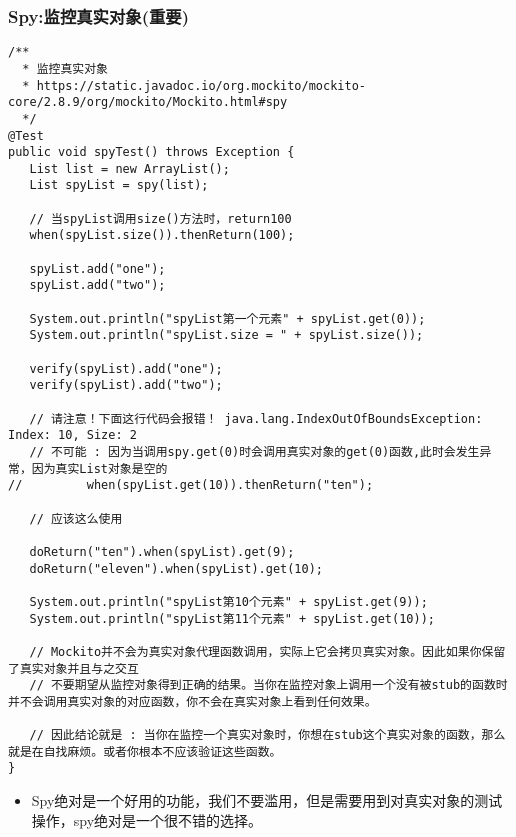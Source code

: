 \documentclass[9pt, b5paper]{article}
\begin{document}
\subsubsection{Spy:监控真实对象(重要)}
\label{sec-1-1-15}
\begin{verbatim}
/**
  * 监控真实对象
  * https://static.javadoc.io/org.mockito/mockito-core/2.8.9/org/mockito/Mockito.html#spy
  */
@Test
public void spyTest() throws Exception {
   List list = new ArrayList();
   List spyList = spy(list);

   // 当spyList调用size()方法时，return100
   when(spyList.size()).thenReturn(100);

   spyList.add("one");
   spyList.add("two");

   System.out.println("spyList第一个元素" + spyList.get(0));
   System.out.println("spyList.size = " + spyList.size());

   verify(spyList).add("one");
   verify(spyList).add("two");

   // 请注意！下面这行代码会报错！ java.lang.IndexOutOfBoundsException: Index: 10, Size: 2
   // 不可能 : 因为当调用spy.get(0)时会调用真实对象的get(0)函数,此时会发生异常，因为真实List对象是空的
//         when(spyList.get(10)).thenReturn("ten");

   // 应该这么使用

   doReturn("ten").when(spyList).get(9);
   doReturn("eleven").when(spyList).get(10);

   System.out.println("spyList第10个元素" + spyList.get(9));
   System.out.println("spyList第11个元素" + spyList.get(10));

   // Mockito并不会为真实对象代理函数调用，实际上它会拷贝真实对象。因此如果你保留了真实对象并且与之交互
   // 不要期望从监控对象得到正确的结果。当你在监控对象上调用一个没有被stub的函数时并不会调用真实对象的对应函数，你不会在真实对象上看到任何效果。

   // 因此结论就是 : 当你在监控一个真实对象时，你想在stub这个真实对象的函数，那么就是在自找麻烦。或者你根本不应该验证这些函数。
}
\end{verbatim}
\begin{itemize}
\item Spy绝对是一个好用的功能，我们不要滥用，但是需要用到对真实对象的测试操作，spy绝对是一个很不错的选择。
\end{itemize}
\end{document}
